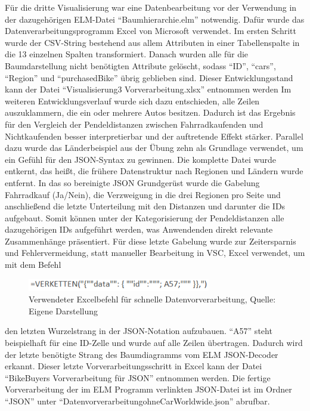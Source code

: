 \documentclass[usegeometry=true]{scrartcl}
\begin{document}
Für die dritte Visualisierung war eine Datenbearbeitung vor der Verwendung in der dazugehörigen ELM-Datei "`Baumhierarchie.elm"' notwendig.
Dafür wurde das Datenverarbeitungsprogramm Excel von Microsoft verwendet. 
Im ersten Schritt wurde der CSV-String bestehend aus allem Attributen in einer Tabellenspalte in die 13 einzelnen Spalten transformiert. Danach wurden alle für die Baumdarstellung nicht benötigten Attribute gelöscht, sodass "`ID"', "`cars"', "`Region"' und "`purchasedBike"' übrig geblieben sind. Dieser Entwicklungsstand kann der Datei "`Visualisierung3 Vorverarbeitung.xlsx"' entnommen werden  Im weiteren Entwicklungsverlauf wurde sich dazu entschieden, alle Zeilen  auszuklammern, die ein oder mehrere Autos besitzen. Dadurch ist das Ergebnis für den Vergleich der Pendeldistanzen zwischen Fahrradkaufenden und Nichtkaufenden besser interpretierbar und der auftretende Effekt stärker. 
Parallel dazu wurde das Länderbeispiel aus der Übung zehn als Grundlage verwendet, um ein Gefühl für den JSON-Syntax zu gewinnen. Die komplette Datei wurde entkernt, das heißt, die frühere Datenstruktur nach Regionen und  Ländern wurde entfernt. In das so bereinigte JSON Grundgerüst wurde die Gabelung Fahrradkauf (Ja/Nein), die  Verzweigung in die drei Regionen pro Seite und anschließend die letzte Unterteilung mit den Distanzen und darunter die IDs aufgebaut. Somit können unter der Kategorisierung der Pendeldistanzen alle dazugehörigen IDs aufgeführt werden, was Anwendenden direkt relevante Zusammenhänge präsentiert. Für diese letzte Gabelung wurde zur Zeitersparnis und Fehlervermeidung, statt manueller Bearbeitung in VSC, Excel verwendet, um mit dem Befehl
\begin{figure}[h]
\begin{center}
\includegraphics[width=8cm]{Bilder/Excelbefehl.png}
\caption{Verwendeter Excelbefehl für schnelle Datenvorverarbeitung, Quelle: Eigene Darstellung}
\end{center}
\end{figure} 
\newline den letzten Wurzelstrang in der JSON-Notation aufzubauen. "`A57"' steht beispielhaft für eine ID-Zelle und wurde auf alle Zeilen übertragen. Dadurch wird der letzte benötigte  Strang des Baumdiagramms vom ELM JSON-Decoder erkannt. Dieser letzte Vorverarbeitungsschritt in Excel kann der Datei "`BikeBuyers Vorverarbeitung für JSON"' entnommen werden.
Die fertige Vorverarbeitung der im ELM Programm verlinkten JSON-Datei ist im Ordner "`JSON"' unter "`DatenvorverarbeitungohneCarWorldwide.json"' abrufbar.
\end{document}
